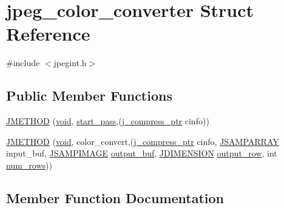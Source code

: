 \hypertarget{structjpeg__color__converter}{}\section{jpeg\+\_\+color\+\_\+converter Struct Reference}
\label{structjpeg__color__converter}


{\ttfamily \#include $<$jpegint.\+h$>$}

\subsection*{Public Member Functions}
\begin{DoxyCompactItemize}
\item 
\hyperlink{structjpeg__color__converter_a1c9f24e568c3d4f67cb2021066825997}{J\+M\+E\+T\+H\+O\+D} (\hyperlink{png_8h_aa8c59027f9ab2769342f248709d68d17}{void}, \hyperlink{jddctmgr_8c_a1964f006adb8fb80f57e455f6452aec1}{start\+\_\+pass},(\hyperlink{jpeglib_8h_add2a072c54e3a51550f4975f7ddb91e7}{j\+\_\+compress\+\_\+ptr} cinfo))
\item 
\hyperlink{structjpeg__color__converter_aed90a059ad823add4785973694ed5eb9}{J\+M\+E\+T\+H\+O\+D} (\hyperlink{png_8h_aa8c59027f9ab2769342f248709d68d17}{void}, color\+\_\+convert,(\hyperlink{jpeglib_8h_add2a072c54e3a51550f4975f7ddb91e7}{j\+\_\+compress\+\_\+ptr} cinfo, \hyperlink{jpeglib_8h_ac9d5d1b829ed51769db69a37271a7e91}{J\+S\+A\+M\+P\+A\+R\+R\+A\+Y} input\+\_\+buf, \hyperlink{jpeglib_8h_a4bf858e4d42202287e786bdec2f3b62b}{J\+S\+A\+M\+P\+I\+M\+A\+G\+E} \hyperlink{jdct_8h_ad7e4660a191b1a791748dd44d5a7a0ec}{output\+\_\+buf}, \hyperlink{jmorecfg_8h_a04ed4674f6f1d0d50ec241531e38274f}{J\+D\+I\+M\+E\+N\+S\+I\+O\+N} \hyperlink{jpegint_8h_a58518ef80cb2e9d15ba1837bef666ec6}{output\+\_\+row}, int \hyperlink{jpegint_8h_ac5f8b57092da0f421713ba171c4c9f87}{num\+\_\+rows}))
\end{DoxyCompactItemize}


\subsection{Member Function Documentation}
\hypertarget{structjpeg__color__converter_a1c9f24e568c3d4f67cb2021066825997}{}
